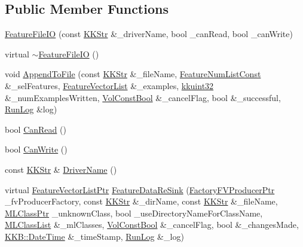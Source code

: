 \subsection*{Public Member Functions}
\begin{DoxyCompactItemize}
\item 
\hyperlink{class_k_k_m_l_l_1_1_feature_file_i_o_a820170380cfca6a036a29d2c51b8441a}{Feature\+File\+IO} (const \hyperlink{class_k_k_b_1_1_k_k_str}{K\+K\+Str} \&\+\_\+driver\+Name, bool \+\_\+can\+Read, bool \+\_\+can\+Write)
\item 
virtual \hyperlink{class_k_k_m_l_l_1_1_feature_file_i_o_a8950552656c29473a293f1e784d08089}{$\sim$\+Feature\+File\+IO} ()
\item 
void \hyperlink{class_k_k_m_l_l_1_1_feature_file_i_o_a6bdcfb8abc28308e215e9c2bd0b9d778}{Append\+To\+File} (const \hyperlink{class_k_k_b_1_1_k_k_str}{K\+K\+Str} \&\+\_\+file\+Name, \hyperlink{namespace_k_k_m_l_l_ad276a9ed309552a63300bce930bdfebd}{Feature\+Num\+List\+Const} \&\+\_\+sel\+Features, \hyperlink{class_k_k_m_l_l_1_1_feature_vector_list}{Feature\+Vector\+List} \&\+\_\+examples, \hyperlink{namespace_k_k_b_af8d832f05c54994a1cce25bd5743e19a}{kkuint32} \&\+\_\+num\+Examples\+Written, \hyperlink{namespace_k_k_b_a7d390f568e2831fb76b86b56c87bf92f}{Vol\+Const\+Bool} \&\+\_\+cancel\+Flag, bool \&\+\_\+successful, \hyperlink{class_k_k_b_1_1_run_log}{Run\+Log} \&log)
\item 
bool \hyperlink{class_k_k_m_l_l_1_1_feature_file_i_o_ab2cccc2f82282c5b445f7e75d0e8008c}{Can\+Read} ()
\item 
bool \hyperlink{class_k_k_m_l_l_1_1_feature_file_i_o_a2ba558a088190e39da61ba2c8cb47657}{Can\+Write} ()
\item 
const \hyperlink{class_k_k_b_1_1_k_k_str}{K\+K\+Str} \& \hyperlink{class_k_k_m_l_l_1_1_feature_file_i_o_a98951a8ef9ae5fe5fca831afb57dc1c7}{Driver\+Name} ()
\item 
virtual \hyperlink{namespace_k_k_m_l_l_acf2ba92a3cf03e2b19674b24ff488ef6}{Feature\+Vector\+List\+Ptr} \hyperlink{class_k_k_m_l_l_1_1_feature_file_i_o_a287df1dbb04495d7a4dc23b3af1a2ca6}{Feature\+Data\+Re\+Sink} (\hyperlink{namespace_k_k_m_l_l_a82812d1feb85a6cff72d059bc67bb90e}{Factory\+F\+V\+Producer\+Ptr} \+\_\+fv\+Producer\+Factory, const \hyperlink{class_k_k_b_1_1_k_k_str}{K\+K\+Str} \&\+\_\+dir\+Name, const \hyperlink{class_k_k_b_1_1_k_k_str}{K\+K\+Str} \&\+\_\+file\+Name, \hyperlink{namespace_k_k_m_l_l_ac272393853d59e72e8456f14cd6d8c23}{M\+L\+Class\+Ptr} \+\_\+unknown\+Class, bool \+\_\+use\+Directory\+Name\+For\+Class\+Name, \hyperlink{class_k_k_m_l_l_1_1_m_l_class_list}{M\+L\+Class\+List} \&\+\_\+ml\+Classes, \hyperlink{namespace_k_k_b_a7d390f568e2831fb76b86b56c87bf92f}{Vol\+Const\+Bool} \&\+\_\+cancel\+Flag, bool \&\+\_\+changes\+Made, \hyperlink{class_k_k_b_1_1_date_time}{K\+K\+B\+::\+Date\+Time} \&\+\_\+time\+Stamp, \hyperlink{class_k_k_b_1_1_run_log}{Run\+Log} \&\+\_\+log)

\end{DoxyCompactItemize}
